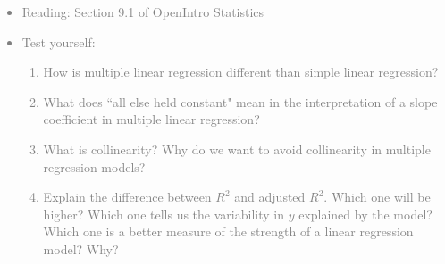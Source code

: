 \documentclass[11pt]{article}
\newcommand{\gray}[1]{\textcolor{gray}{#1}}
\begin{document}
\gray{
{\it
\vspace{-0.55cm}
\begin{itemize}
\renewcommand{\labelitemi}{{\textcolor{dark}{$\ast$}}}
\item Reading: Section 9.1 of OpenIntro Statistics
\item Test yourself:
\begin{enumerate}
\item How is multiple linear regression different than simple linear regression?
\item What does ``all else held constant" mean in the interpretation of a slope coefficient in multiple linear regression?
\item What is collinearity? Why do we want to avoid collinearity in multiple regression models?
\item Explain the difference between $R^2$ and adjusted $R^2$. Which one will be higher? Which one tells us the variability in $y$ explained by the model? Which one is a better measure of the strength of a linear regression model? Why?
\end{enumerate}
\end{itemize}
}}

%

\vspace{0.48cm}
\end{document}
